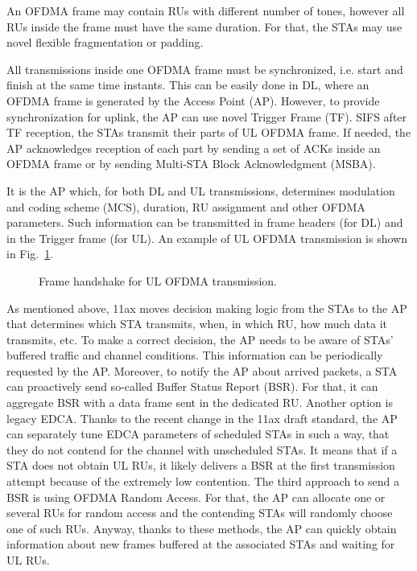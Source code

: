 An OFDMA frame may contain RUs with different number of tones, however all RUs inside the frame must have the same duration.
For that, the STAs may use novel flexible fragmentation or padding. 

All transmissions inside one OFDMA frame must be synchronized, i.e. start and finish at the same time instants.
This can be easily done in DL, where an OFDMA frame is generated by the Access Point (AP).
However, to provide synchronization for uplink, the AP can use novel Trigger Frame (TF).
SIFS after TF reception, the STAs transmit their parts of UL OFDMA frame.
If needed, the AP acknowledges reception of each part by sending a set of ACKs inside an OFDMA frame or by sending Multi-STA Block Acknowledgment (MSBA).

It is the AP which, for both DL and UL transmissions, determines modulation and coding scheme (MCS), duration, RU assignment and other OFDMA parameters. Such information can be transmitted in frame headers (for DL) and in the Trigger frame (for UL). An example of UL OFDMA transmission is shown in Fig.~\ref{fig:transmission}. 

\begin{figure}[tb]
	\centering{
		}
	\caption{\label{fig:transmission} Frame handshake for UL OFDMA transmission.}
\vspace{-0.5em}
\end{figure}

As mentioned above, 11ax moves decision making logic from the STAs to the AP that determines which STA transmits, when, in which RU, how much data it transmits, etc.
To make a correct decision, the AP needs to be aware of STAs' buffered traffic and channel conditions.
This information can be periodically requested by the AP.
Moreover, to notify the AP about arrived packets, a STA can proactively send so-called Buffer Status Report (BSR).
For that, it can aggregate BSR with a data frame sent in the dedicated RU.
Another option is legacy EDCA.
Thanks to the recent change in the 11ax draft standard, the AP can separately tune EDCA parameters of scheduled STAs in such a way, that they do not contend for the channel with unscheduled STAs.
It means that if a STA does not obtain UL RUs, it likely delivers a BSR at the first transmission attempt because of the extremely low contention.
The third approach to send a BSR is using OFDMA Random Access.
For that, the AP can allocate one or several RUs for random access and the contending STAs will randomly choose one of such RUs. 
Anyway, thanks to these methods, the AP can quickly obtain information about new frames buffered  at the associated STAs and waiting for UL RUs.

